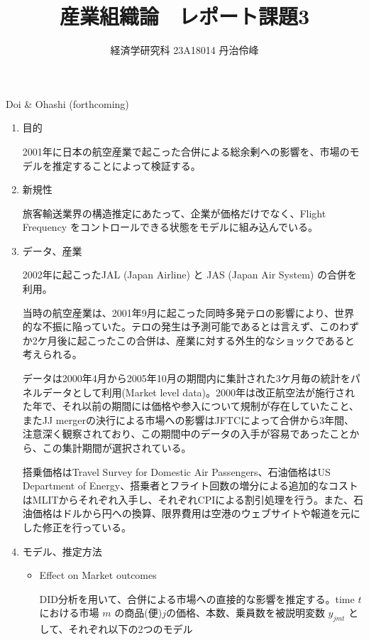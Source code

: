 \documentclass{jsarticle}
\begin{document}
\title{産業組織論　レポート課題3}
\author{経済学研究科 23A18014 丹治伶峰}
\date{}
\maketitle

Doi \& Ohashi (forthcoming)

\begin{enumerate}

\item 目的

2001年に日本の航空産業で起こった合併による総余剰への影響を、市場のモデルを推定することによって検証する。

\item 新規性

旅客輸送業界の構造推定にあたって、企業が価格だけでなく、Flight Frequency をコントロールできる状態をモデルに組み込んでいる。

\item データ、産業

2002年に起こったJAL (Japan Airline) と JAS (Japan Air System) の合併を利用。

当時の航空産業は、2001年9月に起こった同時多発テロの影響により、世界的な不振に陥っていた。テロの発生は予測可能であるとは言えず、このわずか2ケ月後に起こったこの合併は、産業に対する外生的なショックであると考えられる。

データは2000年4月から2005年10月の期間内に集計された3ケ月毎の統計をパネルデータとして利用(Market level data)。2000年は改正航空法が施行された年で、それ以前の期間には価格や参入について規制が存在していたこと、またJJ mergerの決行による市場への影響はJFTCによって合併から3年間、注意深く観察されており、この期間中のデータの入手が容易であったことから、この集計期間が選択されている。

搭乗価格はTravel Survey for Domestic Air Passengers、石油価格はUS Department of Energy、搭乗者とフライト回数の増分による追加的なコストはMLITからそれぞれ入手し、それぞれCPIによる割引処理を行う。また、石油価格はドルから円への換算、限界費用は空港のウェブサイトや報道を元にした修正を行っている。

\item モデル、推定方法

\begin{itemize}

\item Effect on Market outcomes

DID分析を用いて、合併による市場への直接的な影響を推定する。time $t$における市場 $m$ の商品(便)$j$の価格、本数、乗員数を被説明変数 $y_{jmt}$ として、それぞれ以下の2つのモデル


\end{itemize}
\end{enumerate}
\end{document}
